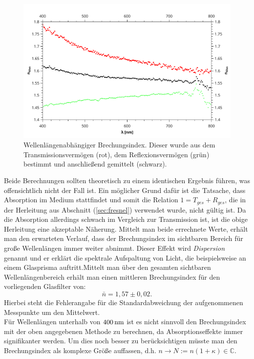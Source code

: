	\begin{figure} [ht]
				\centering
				\includegraphics[width=\linewidth]{pic/n_glas.pdf}
				\caption{Wellenlängenabhängiger Brechungsindex. Dieser wurde aus dem Transmissionsvermögen (rot), dem Reflexionsvermögen (grün) bestimmt und anschließend gemittelt (schwarz).}
				\label{fig:n_glas}
	\end{figure} 
	Beide Berechnungen sollten theoretisch zu einem identischen Ergebnis führen, was offensichtlich nicht der Fall ist. Ein möglicher Grund dafür ist die Tatsache, dass Absorption im Medium stattfindet und somit die Relation $1 = T_{ges} + R_{ges}$, die in der Herleitung aus Abschnitt (\ref{sec:fresnel}) verwendet wurde, nicht gültig ist. Da die Absorption allerdings schwach im Vergleich zur Transmission ist, ist die obige Herleitung eine akzeptable Näherung. Mittelt man beide errechnete Werte, erhält man den erwarteten Verlauf, dass der Brechungsindex im sichtbaren Bereich für große Wellenlängen immer weiter abnimmt. Dieser Effekt wird \textit{Dispersion} genannt und er erklärt die spektrale Aufspaltung von Licht, die beispielsweise an einem Glasprisma auftritt.Mittelt man über den gesamten sichtbaren Wellenlängenbereich erhält man einen mittleren Brechungsindex für den vorliegenden Glasfilter von:
	\begin{equation}
		\bar{n} = 1,57 \pm 0,02.
	\end{equation}
	Hierbei steht die Fehlerangabe für die Standardabweichung der aufgenommenen Messpunkte um den Mittelwert.\\
	Für Wellenlängen unterhalb  von $\unit[400]{nm}$ ist es nicht sinnvoll den Brechungsindex mit der oben angegebenen Methode zu berechnen, da Absorptionseffekte immer signifikanter werden. Um dies noch besser zu berücksichtigen müsste man den Brechungsindex als komplexe Größe auffassen, d.h. $n \rightarrow N := n(1 + \kappa) \in \mathbb{C}$.
	
